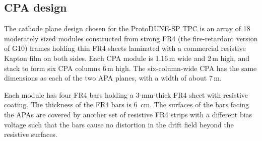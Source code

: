 \subsection{CPA design}



The cathode plane design chosen for the ProtoDUNE-SP TPC is an array of 18 moderately sized modules constructed from strong FR4 (the fire-retardant version of G10) frames holding thin FR4 sheets laminated with a commercial resistive Kapton film on both sides.   Each CPA module is 1.16\,m wide and 2\,m high, and stack to form six CPA columns 6\,m high.  The six-column-wide CPA has the same dimensions as each of the two APA planes, with a width of about 7\,m.


Each module has four FR4 bars holding a 3-mm-thick FR4 sheet with resistive coating.  The thickness of the FR4 bars is 6~cm. 
 The surfaces of the bars facing the APAs are covered by another set of resistive FR4 strips with a different bias voltage such that 
 the bars cause no distortion in the drift field beyond the resistive surfaces.

